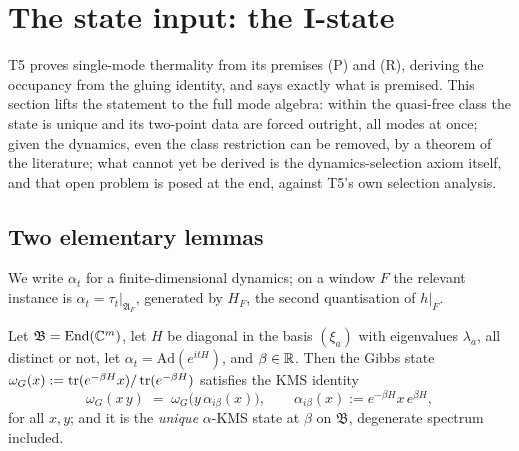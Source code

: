 \section{The state input: the I-state}\label{sec:state}

T5 proves single-mode thermality from its premises (P) and (R), deriving the occupancy from the gluing identity, and says exactly what is premised. This section lifts the statement to the full mode algebra: within the quasi-free class the state is unique and its two-point data are forced outright, all modes at once; given the dynamics, even the class restriction can be removed, by a theorem of the literature; what cannot yet be derived is the dynamics-selection axiom itself, and that open problem is posed at the end, against T5's own selection analysis.

\subsection{Two elementary lemmas}\label{subsec:lemmas}

We write $\alpha_t$ for a finite-dimensional dynamics; on a window $F$ the relevant instance is $\alpha_t = \tau_t|_{\mathfrak{A}_F}$, generated by $H_F$, the second quantisation of $h|_F$.

\begin{lemma}\label{lem:gibbs}
Let $\mathfrak{B} = \operatorname{End}(\mathbb{C}^m)$, let $H$ be diagonal in the basis $(\xi_a)$ with eigenvalues $\lambda_a$, all distinct or not, let $\alpha_t = \mathrm{Ad}(e^{itH})$, and $\beta \in \mathbb{R}$. Then the Gibbs state $\omega_G(x) := \operatorname{tr}(e^{-\beta H}x)/\operatorname{tr}(e^{-\beta H})$ satisfies the KMS identity
\[
\omega_G(x\,y) \;=\; \omega_G\bigl(y\,\alpha_{i\beta}(x)\bigr), \qquad \alpha_{i\beta}(x) := e^{-\beta H}x\,e^{\beta H},
\]
for all $x, y$; and it is the \emph{unique} $\alpha$-KMS state at $\beta$ on $\mathfrak{B}$, degenerate spectrum included.
\end{lemma}

